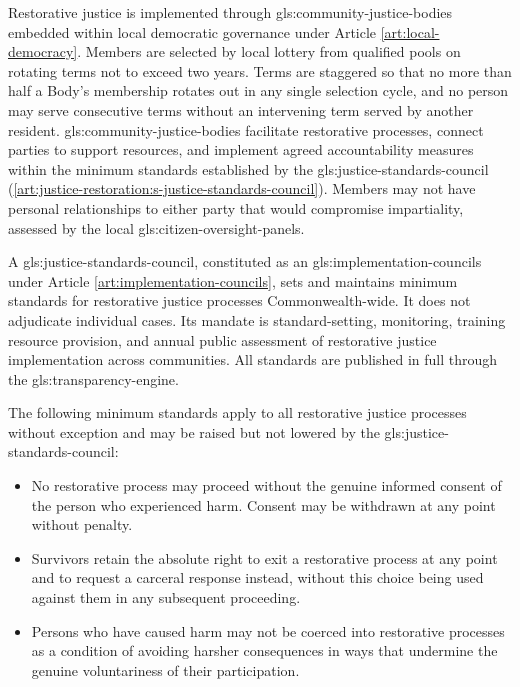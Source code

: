 Restorative justice is implemented through \gls{gls:community-justice-bodies} embedded within local democratic governance under Article \ref{art:local-democracy}. Members are selected by local lottery from qualified pools on rotating terms not to exceed two years. Terms are staggered so that no more than half a Body's membership rotates out in any single selection cycle, and no person may serve consecutive terms without an intervening term served by another resident. \gls{gls:community-justice-bodies} facilitate restorative processes, connect parties to support resources, and implement agreed accountability measures within the minimum standards established by the \gls{gls:justice-standards-council} (\ref{art:justice-restoration:s-justice-standards-council}). Members may not have personal relationships to either party that would compromise impartiality, assessed by the local \gls{gls:citizen-oversight-panels}.

A \gls{gls:justice-standards-council}, constituted as an \gls{gls:implementation-councils} under Article \ref{art:implementation-councils}, sets and maintains minimum standards for restorative justice processes Commonwealth-wide. It does not adjudicate individual cases. Its mandate is standard-setting, monitoring, training resource provision, and annual public assessment of restorative justice implementation across communities. All standards are published in full through the \gls{gls:transparency-engine}.

The following minimum standards apply to all restorative justice processes without exception and may be raised but not lowered by the \gls{gls:justice-standards-council}:
\begin{itemize}
  \item No restorative process may proceed without the genuine informed consent of the person who experienced harm. Consent may be withdrawn at any point without penalty.
  \item Survivors retain the absolute right to exit a restorative process at any point and to request a carceral response instead, without this choice being used against them in any subsequent proceeding.
  \item Persons who have caused harm may not be coerced into restorative processes as a condition of avoiding harsher consequences in ways that undermine the genuine voluntariness of their participation.
\end{itemize}

